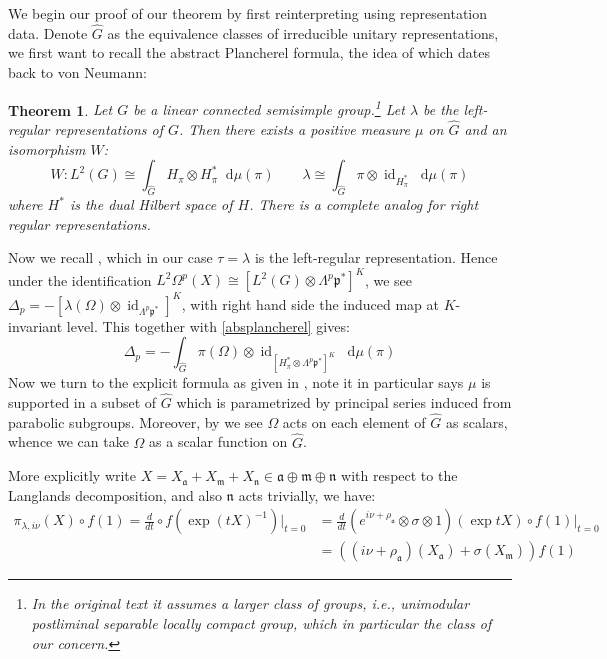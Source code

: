 \documentclass[11pt]{report}
\theoremstyle{definition}
\theoremstyle{plain}
\newtheorem{Theo}[Def]{Theorem}
\DeclareMathOperator{\id}{id}
\renewcommand{\hat}{\widehat}
\newcommand{\mass}[1]{\mathop{}\mathrm{d}{#1}}
\newcommand{\Lie}[1]{\mathfrak{#1}}
\begin{document}
We begin our proof of our theorem by first reinterpreting  using representation data. Denote $\hat{G}$ as the equivalence classes of irreducible unitary representations, we first want to recall the abstract Plancherel formula, the idea of which dates back to von Neumann:
\begin{Theo}\label{abstract Plancherel}
	\textnormal{\cite[Theorem~18.8.1]{dixmier1982}} Let $G$ be a linear connected semisimple group.\footnote{In the original text it assumes a larger class of groups, i.e., unimodular postliminal separable locally compact group, which in particular the class of our concern.} Let $\lambda$ be the left-regular representations of $G$. Then there exists a positive measure $\mu$ on $\hat{G}$ and an isomorphism $W$:
	\begin{equation}\label{absplancherel}
	W: L^2(G)\cong \int_{\hat{G}}H_\pi\otimes H_\pi^*\mass{\mu(\pi)} \qquad \lambda\cong \int_{\hat{G}}\pi\otimes \id_{H^*_\pi}\mass{\mu(\pi)}
	\end{equation}
	where $H^*$ is the dual Hilbert space of $H$. There is a complete analog for right regular representations.
\end{Theo}
Now we recall , which in our case $\tau=\lambda$ is the left-regular representation. Hence under the identification $L^2\Omega^p(X)\cong[L^2(G)\otimes \Lambda^p\Lie{p}^*]^K$, we see $\Delta_p=-[\lambda(\Omega)\otimes \id_{\Lambda^p\Lie{p}^*}]^K$, with right hand side the induced map at $K$-invariant level. This together with \ref{absplancherel} gives:
\begin{equation}\label{casimir=laplacian}
 \Delta_p=-\int_{\hat{G}}^{}\pi(\Omega)\otimes \id_{[H^*_\pi\otimes \Lambda^p\Lie{p}^*]^K}\mass{\mu(\pi)}
\end{equation}
Now we turn to the explicit formula as given in , note it in particular says $\mu$ is supported in a subset of $\hat{G}$ which is parametrized by principal series induced from parabolic subgroups. Moreover, by  we see $\Omega$ acts on each element of $\hat{G}$ as scalars, whence we can take $\Omega$ as a scalar function on $\hat{G}$. 
\par More explicitly write $X=X_\Lie{a}+X_\Lie{m}+X_\Lie{n}\in \Lie{a}\oplus \Lie{m}\oplus\Lie{n}$ with respect to the Langlands decomposition, and also $\Lie{n}$ acts trivially, we have:
\begin{equation}
\begin{split}
\pi_{\lambda, i\nu}(X)\circ f(1)=\frac{d}{dt}\circ f(\exp(tX)^{-1})\big|_{t=0}&=\frac{d}{dt}(e^{i\nu+\rho_\Lie{a}}\otimes \sigma\otimes 1)(\exp tX)\circ f(1)\big|_{t=0}\\
&=((i\nu+\rho_{\Lie{a}})(X_\Lie{a})+\sigma(X_\Lie{m}))f(1)
\end{split}
\end{equation}
\end{document}
